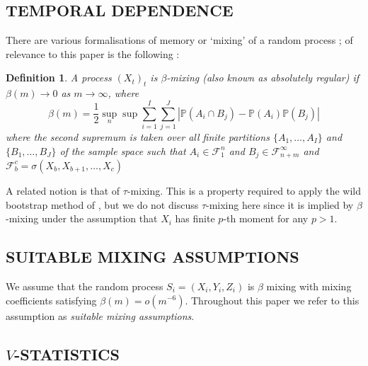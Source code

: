 \documentclass[]{article}
\newtheorem{definition}{Definition}
\begin{document}
\subsection{TEMPORAL DEPENDENCE}
There are various formalisations of memory or `mixing' of a random process \citep{doukhan1994mixing,bradley2005basic,dedecker2007weak}; of relevance to this paper is the following :


\begin{definition}
A process $(X_t)_{t}$ is \emph{$\beta$-mixing} (also known as \emph{absolutely regular}) if $\beta(m) \longrightarrow 0$ as $m\longrightarrow \infty$, where
\[ \beta(m) = \frac{1}{2} \sup_n \sup \sum_{i=1}^I \sum_{j=1}^J | \mathbb{P}(A_i \cap B_j) - \mathbb{P}(A_i)\mathbb{P}(B_j)| \]
where the second supremum is taken  over all finite partitions $\{A_1,\ldots, A_I \}$ and  $\{B_1,\ldots, B_J\}$ of the sample space such that $A_i \in \mathcal{F}_1^n$ and $B_j \in \mathcal{F}_{n+m}^\infty$ and $\mathcal{F}_b^c = \sigma(X_b,X_{b+1},\ldots,X_{c})$
\end{definition}
A related notion is that of $\tau$-mixing. This is a property required to apply the wild bootstrap method of \citet{leucht2013dependent}, but we do not discuss $\tau$-mixing here since it is implied by $\beta$-mixing under the assumption that $X_i$ has finite $p$-th moment for any $p>1$.   


\subsection*{SUITABLE MIXING ASSUMPTIONS} We assume that the random process $S_i = (X_i,Y_i,Z_i)$ is $\beta$ mixing with mixing coefficients satisfying   $\beta(m)  = o(m^{-6})$. Throughout this paper we refer to this assumption as \emph{suitable mixing assumptions}.


\subsection{$V$-STATISTICS}\label{subsection:v-statistic}
\end{document}
